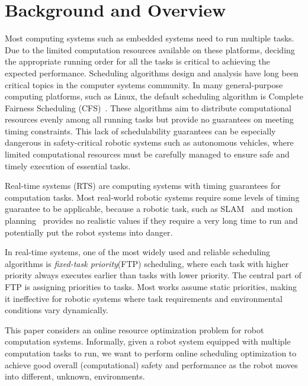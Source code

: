 	\section{Background and Overview}


    Most computing systems such as embedded systems need to run multiple tasks. Due to the limited computation resources available on these platforms, deciding the appropriate running order for all the tasks is critical to achieving the expected performance.
    Scheduling algorithms design and analysis have long been critical topics in the computer systems community. In many general-purpose computing platforms, such as Linux, the default scheduling algorithm is Complete Fairness Scheduling (CFS)~\cite{Bovet2000UnderstandingTL}. These algorithms aim to distribute computational resources evenly among all running tasks but provide no guarantees on meeting timing constraints. This lack of schedulability guarantees can be especially dangerous in safety-critical robotic systems such as autonomous vehicles, where limited computational resources must be carefully managed to ensure safe and timely execution of essential tasks.

    Real-time systems (RTS) are computing systems with timing guarantees for computation tasks. Most real-world robotic systems require some levels of timing guarantee to be applicable, because a robotic task, such as SLAM~\cite{Dellaert2017FactorGF} and motion planning~\cite{Mukadam18ar_steap, Zhang2024SelfAdaptiveRM, Mo2024PrecisionKP} provides no realistic values if they require a very long time to run and potentially put the robot systems into danger.

    In real-time systems, one of the most widely used and reliable scheduling algorithms is \textit{fixed-task priority}(FTP) scheduling, where each task with higher priority always executes earlier than tasks with lower priority. The central part of FTP is assigning priorities to tasks. Most works assume static priorities, making it ineffective for robotic systems where task requirements and environmental conditions vary dynamically.

    This paper considers an online resource optimization problem for robot computation systems. Informally, given a robot system equipped with multiple computation tasks to run, we want to perform online scheduling optimization to achieve good overall (computational) safety and performance as the robot moves into different, unknown, environments.


